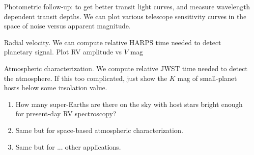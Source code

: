 \documentclass{emulateapj}
\begin{document}
Photometric follow-up: to get better transit light curves, and measure
wavelength dependent transit depths.  We can plot various telescope
sensitivity curves in the space of noise versus apparent magnitude.

Radial velocity. We can compute relative HARPS time needed to detect
planetary signal. Plot RV amplitude vs $V$ mag

Atmospheric characterization. We compute relative JWST time needed to
detect the atmosphere. If this too complicated, just show the $K$ mag of small-planet hosts below some insolation value.

\begin{enumerate}
\item How many super-Earths are there on the sky with host stars bright
   enough for present-day RV spectroscopy?
\item Same but for space-based atmospheric characterization.
\item Same but for ... other applications.
\end{enumerate}

%




% 
% 
% 
\end{document}
